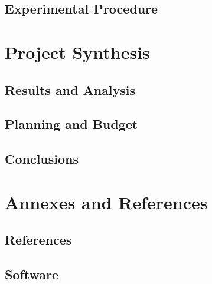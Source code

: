 \documentclass{legrand}
\begin{document}
\chapter{Experimental Procedure}
\label{chapter:experiment}


\part{Project Synthesis}

\chapter{Results and Analysis}
\label{chapter:results}


\chapter{Planning and Budget}
\label{chapter:planning}


\chapter{Conclusions}
\label{chapter:conclusions}


\part{Annexes and References}

\chapter{References} %
\printbibliography[heading=bibempty]


\appendix
\chapter{Software}


\printnoidxglossaries
\end{document}
